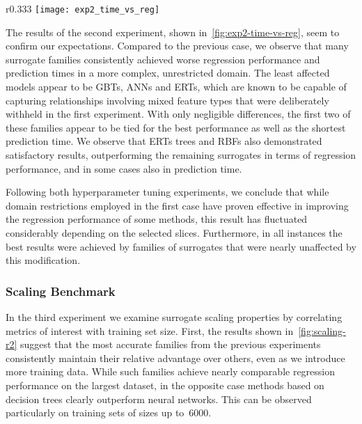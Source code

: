 \begin{wrapfigure}{r}{0.333\textwidth}
	\centering
	\vspace{-3ex}
	\texttt{[image: exp2\_time\_vs\_reg]}
	\caption{Results of experiment~2, plotted analogously
	to~\cref{fig:exp1-time-vs-reg}.}
	\label{fig:exp2-time-vs-reg}
	\vspace{-4ex}
\end{wrapfigure}

The results of the second experiment, shown in~\cref{fig:exp2-time-vs-reg},
seem to confirm our expectations. Compared to the previous case, we observe
that many surrogate families consistently achieved worse regression
performance and prediction times in a more complex, unrestricted domain. The least
affected models appear to be GBTs, ANNs and ERTs, which are known to be capable of capturing relationships
involving mixed feature types that were deliberately withheld in the first
experiment. With only negligible differences, the first two of these families
appear to be tied for the best performance as well as the shortest prediction
time. We observe that ERTs trees and RBFs also
demonstrated satisfactory results, outperforming the remaining surrogates in
terms of regression performance, and in some cases also in prediction time.

Following both hyperparameter tuning experiments, we conclude that while domain
restrictions employed in the first case have proven effective in improving the
regression performance of some methods, this result has fluctuated considerably
depending on the selected slices. Furthermore, in all instances the best
results were achieved by families of surrogates that were nearly unaffected by
this modification.


\subsubsection{Scaling Benchmark}

In the third experiment we examine surrogate scaling properties by correlating
metrics of interest with training set size. First, the results shown 
in~\cref{fig:scaling-r2} suggest that the most accurate families from the previous experiments
consistently maintain their relative advantage over others, even as we introduce
more training data. While such families achieve nearly comparable regression
performance on the largest dataset, in the opposite case methods based on
decision trees clearly outperform neural networks. This can be observed
particularly on training sets of sizes up to~\num{6000}.

